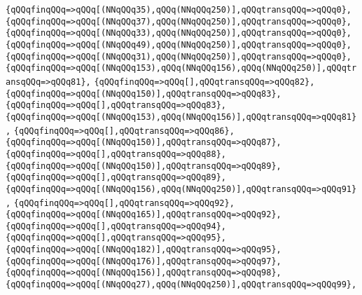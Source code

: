 \verb|{qQQqfinqQQq=>qQQq[(NNqQQq35),qQQq(NNqQQq250)],qQQqtransqQQq=>qQQq0},|\newline
\verb|{qQQqfinqQQq=>qQQq[(NNqQQq37),qQQq(NNqQQq250)],qQQqtransqQQq=>qQQq0},|\newline
\verb|{qQQqfinqQQq=>qQQq[(NNqQQq33),qQQq(NNqQQq250)],qQQqtransqQQq=>qQQq0},|\newline
\verb|{qQQqfinqQQq=>qQQq[(NNqQQq49),qQQq(NNqQQq250)],qQQqtransqQQq=>qQQq0},|\newline
\verb|{qQQqfinqQQq=>qQQq[(NNqQQq31),qQQq(NNqQQq250)],qQQqtransqQQq=>qQQq0},|\newline
\verb|{qQQqfinqQQq=>qQQq[(NNqQQq153),qQQq(NNqQQq156),qQQq(NNqQQq250)],qQQqtransqQQq=>qQQq81},|\newline
\verb|{qQQqfinqQQq=>qQQq[],qQQqtransqQQq=>qQQq82},|\newline
\verb|{qQQqfinqQQq=>qQQq[(NNqQQq150)],qQQqtransqQQq=>qQQq83},|\newline
\verb|{qQQqfinqQQq=>qQQq[],qQQqtransqQQq=>qQQq83},|\newline
\verb|{qQQqfinqQQq=>qQQq[(NNqQQq153),qQQq(NNqQQq156)],qQQqtransqQQq=>qQQq81},|\newline
\verb|{qQQqfinqQQq=>qQQq[],qQQqtransqQQq=>qQQq86},|\newline
\verb|{qQQqfinqQQq=>qQQq[(NNqQQq150)],qQQqtransqQQq=>qQQq87},|\newline
\verb|{qQQqfinqQQq=>qQQq[],qQQqtransqQQq=>qQQq88},|\newline
\verb|{qQQqfinqQQq=>qQQq[(NNqQQq150)],qQQqtransqQQq=>qQQq89},|\newline
\verb|{qQQqfinqQQq=>qQQq[],qQQqtransqQQq=>qQQq89},|\newline
\verb|{qQQqfinqQQq=>qQQq[(NNqQQq156),qQQq(NNqQQq250)],qQQqtransqQQq=>qQQq91},|\newline
\verb|{qQQqfinqQQq=>qQQq[],qQQqtransqQQq=>qQQq92},|\newline
\verb|{qQQqfinqQQq=>qQQq[(NNqQQq165)],qQQqtransqQQq=>qQQq92},|\newline
\verb|{qQQqfinqQQq=>qQQq[],qQQqtransqQQq=>qQQq94},|\newline
\verb|{qQQqfinqQQq=>qQQq[],qQQqtransqQQq=>qQQq95},|\newline
\verb|{qQQqfinqQQq=>qQQq[(NNqQQq182)],qQQqtransqQQq=>qQQq95},|\newline
\verb|{qQQqfinqQQq=>qQQq[(NNqQQq176)],qQQqtransqQQq=>qQQq97},|\newline
\verb|{qQQqfinqQQq=>qQQq[(NNqQQq156)],qQQqtransqQQq=>qQQq98},|\newline
\verb|{qQQqfinqQQq=>qQQq[(NNqQQq27),qQQq(NNqQQq250)],qQQqtransqQQq=>qQQq99},|\newline
